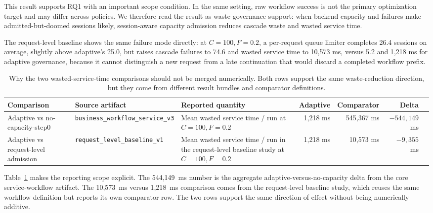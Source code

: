 \documentclass[5p,times]{elsarticle}
\begin{document}
This result supports RQ1 with an important scope condition. In the same setting, raw workflow success is not the primary optimization target and may differ across policies. We therefore read the result as waste-governance support: when backend capacity and failures make admitted-but-doomed sessions likely, session-aware capacity admission reduces cascade waste and wasted service time.

The request-level baseline shows the same failure mode directly: at $C{=}100,F{=}0.2$, a per-request queue limiter completes 26.4 sessions on average, slightly above adaptive's 25.0, but raises cascade failures to 74.6 and wasted service time to 10{,}573 ms, versus 5.2 and 1{,}218 ms for adaptive governance, because it cannot distinguish a new request from a late continuation that would discard a completed workflow prefix.

\begin{table}[t]
\centering
\caption{Why the two wasted-service-time comparisons should not be merged numerically. Both rows support the same waste-reduction direction, but they come from different result bundles and comparator definitions.}
\label{tab:rq1_waste_comparisons}
\footnotesize
\begin{tabular}{@{}>{\raggedright\arraybackslash}p{}>{\raggedright\arraybackslash}p{}>{\raggedright\arraybackslash}p{}rrrr@{}}
\toprule
\textbf{Comparison} & \textbf{Source artifact} & \textbf{Reported quantity} & \textbf{Adaptive} & \textbf{Comparator} & \textbf{Delta} \\
\midrule
Adaptive vs no-capacity-step0 & \texttt{business\_workflow\_service\_v3} & Mean wasted service time / run at $C{=}100,F{=}0.2$ & 1{,}218 ms & 545{,}367 ms & $-544{,}149$ ms \\
Adaptive vs request-level admission & \texttt{request\_level\_baseline\_v1} & Mean wasted service time / run in the request-level baseline study at $C{=}100,F{=}0.2$ & 1{,}218 ms & 10{,}573 ms & $-9{,}355$ ms \\
\bottomrule
\end{tabular}
\end{table}

Table~\ref{tab:rq1_waste_comparisons} makes the reporting scope explicit. The 544{,}149~ms number is the aggregate adaptive-versus-no-capacity delta from the core service-workflow artifact. The 10{,}573~ms versus 1{,}218~ms comparison comes from the request-level baseline study, which reuses the same workflow definition but reports its own comparator row. The two rows support the same direction of effect without being numerically additive.
\end{document}
